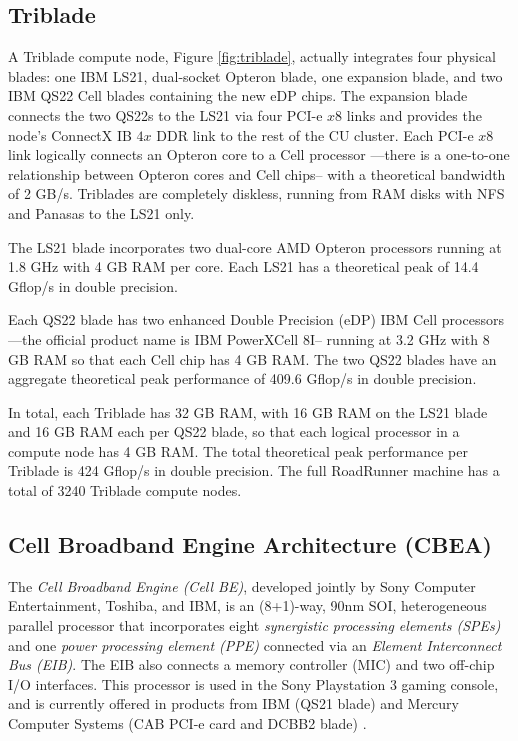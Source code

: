 \documentclass[letter,10pt]{article}
\begin{document}
\subsection*{Triblade}

A Triblade compute node, Figure \ref{fig:triblade}, actually integrates four physical blades: one IBM LS21, dual-socket Opteron blade, one expansion blade, and two IBM QS22 Cell blades containing the new eDP chips.  The expansion blade connects the two QS22s to the LS21 via four PCI-e $x8$ links and provides the node's ConnectX IB $4x$ DDR link to the rest of the CU cluster.  Each PCI-e $x8$ link logically connects an Opteron core to a Cell processor ---there is a one-to-one relationship between Opteron cores and Cell chips-- with a theoretical bandwidth of 2 GB/s.  Triblades are completely diskless, running from RAM disks with NFS and Panasas \cite{panasas} to the LS21 only.

The LS21 blade incorporates two dual-core AMD Opteron processors running at 1.8 GHz with 4 GB RAM per core.  Each LS21 has a theoretical peak of 14.4 Gflop/s in double precision.

Each QS22 blade has two enhanced Double Precision (eDP) IBM Cell processors ---the official product name is IBM PowerXCell 8I-- running at 3.2 GHz with 8 GB RAM so that each Cell chip has 4 GB RAM.  The two QS22 blades have an aggregate theoretical peak performance of 409.6 Gflop/s in double precision.

In total, each Triblade has 32 GB RAM, with 16 GB RAM on the LS21 blade and 16 GB RAM each per QS22 blade, so that each logical processor in a compute node has 4 GB RAM.  The total theoretical peak performance per Triblade is 424 Gflop/s in double precision.  The full RoadRunner machine has a total of 3240 Triblade compute nodes.

\subsection*{Cell Broadband Engine Architecture (CBEA)}


The \emph{Cell Broadband Engine (Cell BE)}, developed jointly by Sony Computer Entertainment, Toshiba, and IBM, is an (8+1)-way, 90nm SOI, heterogeneous parallel processor that incorporates eight \emph{synergistic processing elements (SPEs)} and one \emph{power processing element (PPE)} connected via an \emph{Element Interconnect Bus (EIB)}.  The EIB also connects a memory controller (MIC) and two off-chip I/O interfaces.  This processor is used in the Sony Playstation 3 gaming console, and is currently offered in products from IBM (QS21 blade) and Mercury Computer Systems (CAB PCI-e card and DCBB2 blade) \cite{mercury}.
\end{document}

